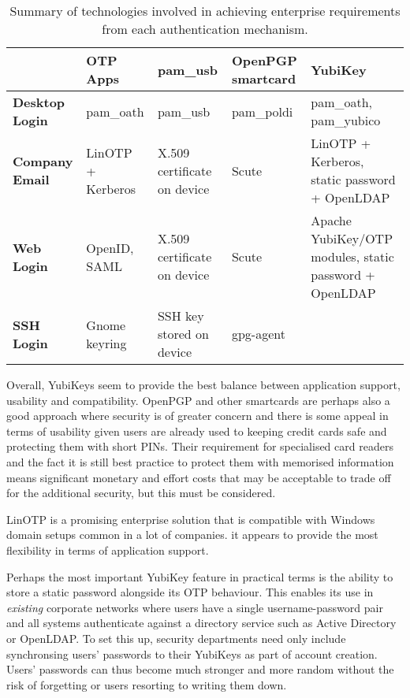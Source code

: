 \documentclass{report}
\begin{document}
\begin{sidewaystable}[p]
\centering
  \begin{tabular}{|l|p{4cm}|p{4cm}|p{4cm}|p{4cm}|} \hline
                            & \textbf{OTP Apps} & \textbf{pam\_usb} & \textbf{OpenPGP smartcard} & \textbf{YubiKey} \\ \hline
    \textbf{Desktop Login}  & pam\_oath        & pam\_usb                    & pam\_poldi & pam\_oath, pam\_yubico  \\ \hline
    \textbf{Company Email}  & LinOTP + Kerberos & X.509 certificate on device & Scute      & LinOTP + Kerberos, static password + OpenLDAP   \\ \hline
    \textbf{Web Login}      & OpenID, SAML     & X.509 certificate on device & Scute      & Apache YubiKey/OTP modules, static password + OpenLDAP  \\ \hline
    \textbf{SSH Login}      & Gnome keyring    & SSH key stored on device    & gpg-agent  &  \\ \hline
  \end{tabular}
  \label{table:overview}
  \caption{Summary of technologies involved in achieving enterprise requirements from each authentication mechanism.}
\end{sidewaystable}

Overall, YubiKeys seem to provide the best balance between application support,
usability and compatibility. OpenPGP and other smartcards are perhaps also
a good approach where security is of greater concern and there is some appeal
in terms of usability given users are already used to keeping credit cards
safe and protecting them with short PINs. Their requirement for specialised
card readers and the fact it is still best practice to protect them with memorised
information means significant monetary and effort costs that may be acceptable
to trade off for the additional security, but this must be considered.

LinOTP is a promising enterprise solution that is compatible with Windows
domain setups common in a lot of companies. it appears to provide the most
flexibility in terms of application support.

Perhaps the most important YubiKey feature in practical terms is the ability
to store a static password alongside its OTP behaviour. This enables its
use in \emph{existing} corporate networks where users have a single username-password
pair and all systems authenticate against a directory service such as Active Directory
or OpenLDAP. To set this up, security departments need only include synchronsing
users' passwords to their YubiKeys as part of account creation. Users' passwords
can thus become much stronger and more random without the risk of forgetting or
users resorting to writing them down.
\end{document}
